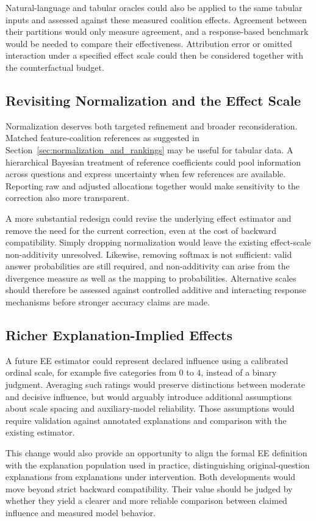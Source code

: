 Natural-language and tabular oracles could also be applied to the same tabular inputs and assessed against these measured coalition effects. Agreement between their partitions would only measure agreement, and a response-based benchmark would be needed to compare their effectiveness. Attribution error or omitted interaction under a specified effect scale could then be considered together with the counterfactual budget.

\subsection{Revisiting Normalization and the Effect Scale}

Normalization deserves both targeted refinement and broader reconsideration. Matched feature-coalition references as suggested in Section~\ref{sec:normalization_and_rankings} may be useful for tabular data. A hierarchical Bayesian treatment of reference coefficients could pool information across questions and express uncertainty when few references are available. Reporting raw and adjusted allocations together would make sensitivity to the correction also more transparent.

A more substantial redesign could revise the underlying effect estimator and remove the need for the current correction, even at the cost of backward compatibility. Simply dropping normalization would leave the existing effect-scale non-additivity unresolved. Likewise, removing softmax is not sufficient: valid answer probabilities are still required, and non-additivity can arise from the divergence measure as well as the mapping to probabilities. Alternative scales should therefore be assessed against controlled additive and interacting response mechanisms before stronger accuracy claims are made.

\subsection{Richer Explanation-Implied Effects}

A future EE estimator could represent declared influence using a calibrated ordinal scale, for example five categories from $0$ to $4$, instead of a binary judgment. Averaging such ratings would preserve distinctions between moderate and decisive influence, but would arguably introduce additional assumptions about scale spacing and auxiliary-model reliability. Those assumptions would require validation against annotated explanations and comparison with the existing estimator.

This change would also provide an opportunity to align the formal EE definition with the explanation population used in practice, distinguishing original-question explanations from explanations under intervention. Both developments would move beyond strict backward compatibility. Their value should be judged by whether they yield a clearer and more reliable comparison between claimed influence and measured model behavior.
